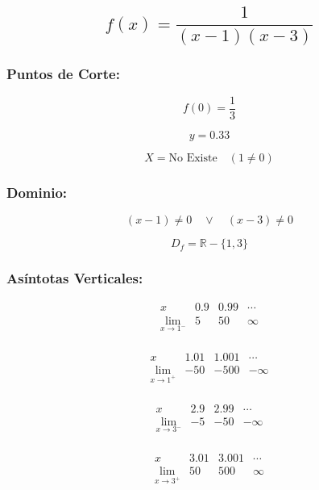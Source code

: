 \subsection*{\[f(x) = \frac{1}{(x-1)(x-3)}\]}

\subsubsection*{Puntos de Corte:}

\[
f(0) = \frac{1}{3}
\]

\[
y = 0.33
\]

\[
X = \text{No Existe} \quad (1 \neq 0)
\]

\subsubsection*{Dominio:}

\[
(x-1) \neq 0 \quad \vee \quad (x-3) \neq 0
\]

\[
D_f = \mathbb{R} - \{1,3\}
\]

\subsubsection*{Asíntotas Verticales:}

\[
\begin{array}{c|c|c|c}
x & 0.9 & 0.99 & \cdots \\
\hline
\lim_{x \to 1^-} & 5 & 50 & \infty \\
\end{array}
\]

\[
\begin{array}{c|c|c|c}
x & 1.01 & 1.001 & \cdots \\
\hline
\lim_{x \to 1^+} & -50 & -500 & -\infty \\
\end{array}
\]

\[
\begin{array}{c|c|c|c}
x & 2.9 & 2.99 & \cdots \\
\hline
\lim_{x \to 3^-} & -5 & -50 & -\infty \\
\end{array}
\]

\[
\begin{array}{c|c|c|c}
x & 3.01 & 3.001 & \cdots \\
\hline
\lim_{x \to 3^+} & 50 & 500 & \infty \\
\end{array}
\]



